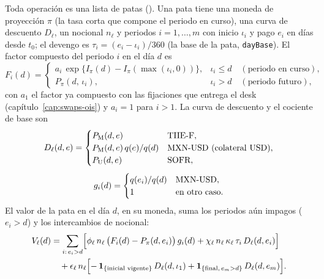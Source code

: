 \begin{sloppypar}
Toda operación es una lista de patas (). Una pata tiene una moneda de
proyección $\pi$ (la tasa corta que compone el periodo en curso), una curva de descuento $D_\ell$, un nocional $n_\ell$
y periodos $i=1,\dots,m$ con inicio $\iota_i$ y pago $e_i$ en días desde $t_0$; el devengo es $\tau_i=(e_i-\iota_i)/360$ (la
base de la pata, \texttt{dayBase}). El factor compuesto del periodo $i$ en el día $d$ es
\begin{equation}\label{eq:cap14-compuesto}
  F_i(d)=\begin{cases}
    a_i\,\exp\bigl\{I_\pi(d)-I_\pi(\max(\iota_i,0))\bigr\}, & \iota_i\le d \quad(\text{periodo en curso}),\\[2pt]
    P_\pi(d,\,\iota_i), & \iota_i>d \quad(\text{periodo futuro}),
  \end{cases}
\end{equation}
con $a_1$ el factor ya compuesto con las fijaciones que entrega el desk (capítulo~\ref{cap:swaps-ois}) y $a_i=1$ para
$i>1$. La curva de descuento y el cociente de base son
\begin{equation}\label{eq:cap14-descuento}
\begin{gathered}
  D_\ell(d,e)=\begin{cases}
    P_{\mathrm M}(d,e) & \text{TIIE-F},\\
    P_{\mathrm M}(d,e)\,q(e)/q(d) & \text{MXN-USD (colateral \textup{USD})},\\
    P_{\mathrm U}(d,e) & \text{SOFR},
  \end{cases}\\[4pt]
  g_i(d)=\begin{cases} q(e_i)/q(d) & \text{MXN-USD},\\ 1 & \text{en otro caso.}\end{cases}
\end{gathered}
\end{equation}
El valor de la pata en el día $d$, en su moneda, suma los periodos aún impagos ($e_i>d$) y los intercambios de
nocional:
\begin{equation}\label{eq:cap14-pata}
\begin{aligned}
  V_\ell(d)&=\sum_{i:\,e_i>d}\Bigl[\phi_\ell\,n_\ell\,\bigl(F_i(d)-P_\pi(d,e_i)\bigr)\,g_i(d)+\chi_\ell\,n_\ell\,\kappa_\ell\,\tau_i\,D_\ell(d,e_i)\Bigr]\\
  &\quad+\epsilon_\ell\,n_\ell\Bigl[-\,\mathbf 1_{\{\text{inicial vigente}\}}\,D_\ell(d,\iota_1)+\mathbf 1_{\{\text{final},\,e_m>d\}}\,D_\ell(d,e_m)\Bigr].
\end{aligned}

\end{equation}
\end{sloppypar}
